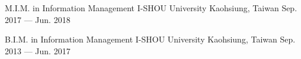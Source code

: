 

\begin{cventries}

  \cventry
    {M.I.M. in Information Management} %
    {I-SHOU University} %
    {Kaohsiung, Taiwan} %
    {Sep. 2017 --- Jun. 2018} %
    {}

  \cventry
    {B.I.M. in Information Management} %
    {I-SHOU University} %
    {Kaohsiung, Taiwan} %
    {Sep. 2013 --- Jun. 2017} %
    {}

\end{cventries}
